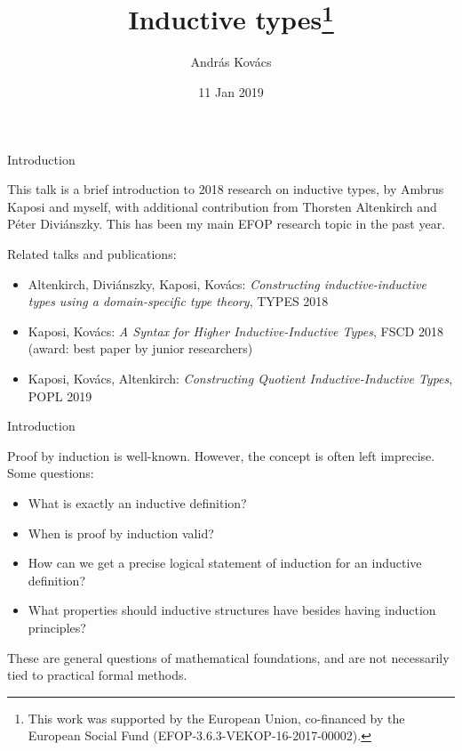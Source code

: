 \documentclass[dvipsnames]{beamer}
\title{Inductive types\thanks{This work was supported by the European Union, co-financed by the European
    Social Fund (EFOP-3.6.3-VEKOP-16-2017-00002).}}
\author{András Kovács}
\institute{Eötvös Loránd University, Budapest}
\date{11 Jan 2019}
\begin{document}
\frame{\titlepage}

\begin{frame}{Introduction}

This talk is a brief introduction to 2018 research on inductive types, by Ambrus
Kaposi and myself, with additional contribution from Thorsten Altenkirch and
Péter Diviánszky. This has been my main EFOP research topic in the past year.
\vspace{1em}

Related talks and publications:

\begin{itemize}
\item Altenkirch, Diviánszky, Kaposi, Kovács: \emph{Constructing inductive-inductive types using a domain-specific type theory}, TYPES 2018
\item Kaposi, Kovács: \emph{A Syntax for Higher
  Inductive-Inductive Types}, FSCD 2018 (award: best paper by junior researchers)
\item Kaposi, Kovács, Altenkirch: \emph{Constructing Quotient Inductive-Inductive Types}, POPL 2019
\end{itemize}

\end{frame}


\begin{frame}{Introduction}

  Proof by induction is well-known. However, the concept is often left imprecise.
  Some questions:

  \begin{itemize}
  \item What is exactly an inductive definition?
  \item When is proof by induction valid?
  \item How can we get a precise logical statement of induction for an inductive definition?
  \item What properties should inductive structures have besides having induction principles?
  \end{itemize}

\vspace{1em}
\pause

These are general questions of mathematical foundations, and are not necessarily tied to practical
formal methods.


\end{frame}
\end{document}

